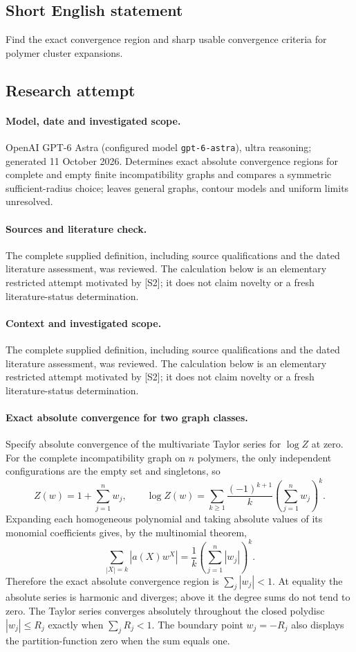 \documentclass[11pt]{article}
\begin{document}
\subsection{Short English statement}
Find the exact convergence region and sharp usable convergence criteria for polymer cluster expansions.
\subsection{Research attempt}
\paragraph{Model, date and investigated scope.}
OpenAI GPT-6 Astra (configured model \texttt{gpt-6-astra}), ultra reasoning; generated 11 October 2026. Determines exact absolute convergence regions for complete and empty finite incompatibility graphs and compares a symmetric sufficient-radius choice; leaves general graphs, contour models and uniform limits unresolved.

\paragraph{Sources and literature check.}
The complete supplied definition, including source qualifications and the dated literature assessment, was reviewed. The calculation below is an elementary restricted attempt motivated by [S2]; it does not claim novelty or a fresh literature-status determination.

\paragraph{Context and investigated scope.} The complete supplied definition, including source qualifications and the dated literature assessment, was reviewed. The calculation below is an elementary restricted attempt motivated by [S2]; it does not claim novelty or a fresh literature-status determination.

\paragraph{Exact absolute convergence for two graph classes.}
Specify absolute convergence of the multivariate Taylor series for $\log Z$ at zero. For the complete incompatibility graph on $n$ polymers, the only independent configurations are the empty set and singletons, so
\[
 Z(w)=1+\sum_{j=1}^n w_j,\qquad
 \log Z(w)=\sum_{k\geq1}\frac{(-1)^{k+1}}k
                   \left(\sum_{j=1}^n w_j\right)^k.
\]
Expanding each homogeneous polynomial and taking absolute values of its monomial coefficients gives, by the multinomial theorem,
\[
 \sum_{|X|=k}|a(X)w^X|=\frac1k\left(\sum_{j=1}^n|w_j|\right)^k.
\]
Therefore the exact absolute convergence region is $\sum_j|w_j|<1$. At equality the absolute series is harmonic and diverges; above it the degree sums do not tend to zero. The Taylor series converges absolutely throughout the closed polydisc $|w_j|\leq R_j$ exactly when $\sum_jR_j<1$. The boundary point $w_j=-R_j$ also displays the partition-function zero when the sum equals one.
\end{document}
